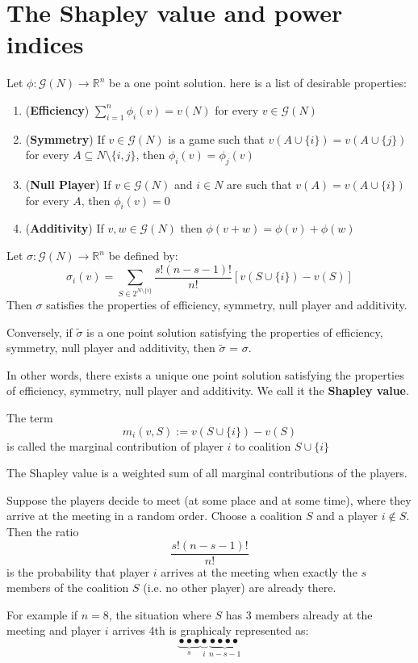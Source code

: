 \documentclass[../main.tex]{subfiles}
\begin{document}
\chapter{The Shapley value and power indices}
Let $\phi: \mathcal{G}(N) \to \mathbb{R}^n$ be a one point solution. here is a list of desirable properties:
\begin{enumerate}
    \item (\textbf{Efficiency}) $\sum_{i=1}^n \phi_i(v) = v(N)$ for every $v \in \mathcal{G}(N)$
    \item (\textbf{Symmetry}) If $v \in \mathcal{G}(N)$ is a game such that $v(A \cup \{i\}) = v(A \cup \{j\})$ for every $A \subseteq N \setminus \{i,j\}$, then $\phi_i(v) = \phi_j(v)$
    \item (\textbf{Null Player}) If $v \in \mathcal{G}(N)$ and $i \in N$ are such that $v(A) = v(A \cup \{i\})$ for every $A$, then $\phi_i(v) = 0$
    \item (\textbf{Additivity}) If $v,w \in \mathcal{G}(N)$ then $\phi(v + w) = \phi(v) + \phi(w)$
\end{enumerate}

\begin{theorem}
    Let $\sigma: \mathcal{G}(N) \to \mathbb{R}^n$ be defined by:
    \[
        \sigma_i(v) = \sum_{S \in 2^{N \setminus \{i\}}} \frac{s!(n-s-1)!}{n!} [v(S \cup \{i\}) - v(S)]
    \]
    Then $\sigma$ satisfies the properties of efficiency, symmetry, null player and additivity.

    Conversely, if $\tilde{\sigma}$ is a one point solution satisfying the properties of efficiency, symmetry, null player and additivity, then $\tilde{\sigma}$ = $\sigma$.
\end{theorem}

In other words, there exists a unique one point solution satisfying the properties of efficiency, symmetry, null player and additivity. We call it the \textbf{Shapley value}.

\begin{definition}
    The term
    \[
        m_i (v,S) := v (S \cup \{i\}) - v(S)
    \]
    is called the marginal contribution of player $i$ to coalition $S \cup \{i\}$
\end{definition}
The Shapley value is a weighted sum of all marginal contributions of the players.

\begin{note}
    Suppose the players decide to meet (at some place and at some time), where they arrive at the meeting in a random order. Choose a coalition $S$ and a player $i \notin S$. Then the ratio
    \[
        \frac{s!(n-s-1)!}{n!}
    \]
    is the probability that player $i$ arrives at the meeting when exactly the $s$ members of the coalition $S$ (i.e. no other player) are already there.

    For example if $n = 8$, the situation where $S$ has 3 members already at the meeting and player $i$ arrives 4th is graphicaly represented as:
    \[
        \underbrace{\bullet \bullet \bullet}_{s} \underbrace{\bullet}_{i} \underbrace{\bullet \bullet \bullet \bullet}_{n-s-1}
    \]
\end{note}
\end{document}
